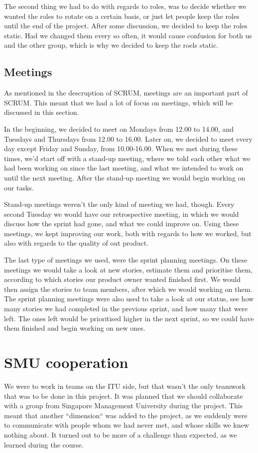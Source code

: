 The second thing we had to do with regards to roles, was to decide whether we wanted the roles to rotate on a certain basis, or just let people keep the roles until the end of the project. After some discussion, we decided to keep the roles static. Had we changed them every so often, it would cause confusion for both us and the other group, which is why we decided to keep the roels static.

\subsection{Meetings}
\label{Collaboration_ITU_Meetings}
As mentioned in the descruption of SCRUM, meetings are an important part of SCRUM. This meant that we had a lot of focus on meetings, which will be discussed in this section.

In the beginning, we decided to meet on Mondays from 12.00 to 14.00, and Tuesdays and Thursdays from 12.00 to 16.00. Later on, we decided to meet every day except Friday and Sunday, from 10.00-16.00. When we met during these times, we'd start off with a stand-up meeting, where we told each other what we had been working on since the last meeting, and what we intended to work on until the next meeting. After the stand-up meeting we would begin working on our tasks.

Stand-up meetings weren't the only kind of meeting we had, though. Every second Tuesday we would have our retrospective meeting, in which we would discuss how the sprint had gone, and what we could improve on. Using these meetings, we kept improving our work, both with regards to how we worked, but also with regards to the quality of out product.

The last type of meetings we used, were the sprint planning meetings. On these meetings we would take a look at new stories, estimate them and prioritise them, according to which stories our product owner wanted finished first. We would then assign the stories to team members, after which we would working on them. The sprint planning meetings were also used to take a look at our status, see how many stories we had completed in the previous sprint, and how many that were left. The ones left would be prioritised higher in the next sprint, so we could have them finished and begin working on new ones.

\section{SMU cooperation}
\label{Collaboration_SMU}
We were to work in teams on the ITU side, but that wasn't the only teamwork that was to be done in this project. It was planned that we should collaborate with a group from Singapore Management University during the project. This meant that another ``dimension`` was added to the project, as we suddenly were to communicate with people whom we had never met, and whose skills we knew nothing about. It turned out to be more of a challenge than expected, as we learned during the course.

